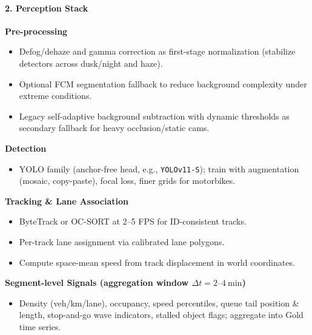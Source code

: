 \paragraph{2. Perception Stack}
	\textbf{Pre-processing}
\begin{itemize}
  \item Defog/dehaze and gamma correction as first-stage normalization (stabilize detectors across dusk/night and haze).
  \item Optional FCM segmentation fallback to reduce background complexity under extreme conditions.
  \item Legacy self-adaptive background subtraction with dynamic thresholds as secondary fallback for heavy occlusion/static cams.
\end{itemize}
	\textbf{Detection}
\begin{itemize}
  \item YOLO family (anchor-free head, e.g., \texttt{YOLOv11-S}); train with augmentation (mosaic, copy-paste), focal loss, finer grids for motorbikes.
\end{itemize}
	\textbf{Tracking \& Lane Association}
\begin{itemize}
  \item ByteTrack or OC-SORT at 2--5 FPS for ID-consistent tracks.
  \item Per-track lane assignment via calibrated lane polygons.
  \item Compute space-mean speed from track displacement in world coordinates.
\end{itemize}
	\textbf{Segment-level Signals (aggregation window $\Delta t = 2\text{--}4\ \text{min}$)}
\begin{itemize}
  \item Density (veh/km/lane), occupancy, speed percentiles, queue tail position \& length, stop-and-go wave indicators, stalled object flags; aggregate into Gold time series.
\end{itemize}


